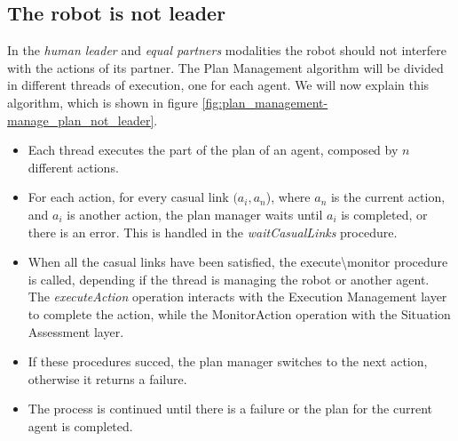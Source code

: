\subsection{The robot is not leader}
\label{subsec:plan_management-robot_not_leader_manager}
In the \textit{human leader} and \textit{equal partners}  modalities the robot should not interfere with the actions of its partner. The Plan Management algorithm will be divided in different threads of execution, one for each agent. We will now explain this algorithm, which is shown in figure \ref{fig:plan_management-manage_plan_not_leader}.
\begin{itemize}
  \item Each thread executes the part of the plan of an agent, composed by $n$ different actions.
  \item For each action, for every casual link $(a_i,a_n$), where $a_n$ is the current action, and $a_i$ is another action, the plan manager waits until $a_i$ is completed, or there is an error. This is handled in the \textit{waitCasualLinks} procedure.
  \item When all the casual links have been satisfied, the execute\textbackslash monitor procedure is called, depending if the thread is managing the robot or another agent. The \textit{executeAction} operation interacts with the Execution Management layer to complete the action, while the MonitorAction operation with the Situation Assessment layer.
  \item If these procedures succed, the plan manager switches to the next action, otherwise it returns a failure.
  \item The process is continued until there is a failure or the plan for the current agent is completed.
\end{itemize} 

